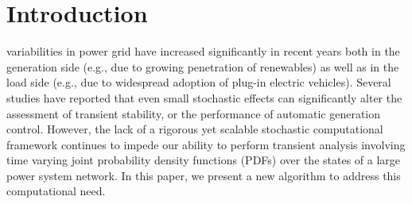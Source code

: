 \documentclass[10pt,twocolumn]{IEEEtran}
\begin{document}
\section{Introduction}\label{sec:intro}

 variabilities in power grid have increased significantly in recent years both in the generation side (e.g., due to growing penetration of renewables) as well as in the load side (e.g., due to widespread adoption of plug-in electric vehicles). Several studies \cite{timko1983monte,nwankpa1992stochastic,odun2012structure,ghanavati2016identifying,apostolopoulou2016assessment} have reported that even small stochastic effects can significantly alter the assessment of transient stability, or the performance of automatic generation control. However, the lack of a rigorous yet scalable stochastic computational framework continues to impede \cite{schwalbe2015mathematical} our ability to perform transient analysis involving time varying joint probability density functions (PDFs) over the states of a large power system network. In this paper, we present a new algorithm to address this computational need.  
\end{document}
